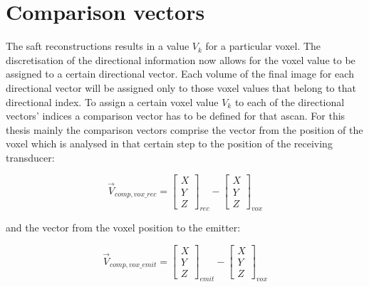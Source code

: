 \section{Comparison vectors}
\label{sec:comp_vect}

The \ac{saft} reconstructions results in a value $V_k$ for a particular voxel. The discretisation of the directional information now allows for the voxel value to be assigned to a certain directional vector. Each volume of the final image for each directional vector will be assigned only to those voxel values that belong to that directional index.
To assign a certain voxel value $V_k$ to each of the directional vectors' indices a comparison vector has to be defined for that \ac{ascan}. For this thesis mainly the comparison vectors comprise the vector from the position of the voxel which is analysed in that certain step to the position of the receiving transducer:

\begin{equation}
\vec{V}_{comp,vox\_rec} = \begin{bmatrix}
X
\\
Y 
\\
Z 
\end{bmatrix}_{rec}
-
\begin{bmatrix}
X
\\
Y 
\\
Z 
\end{bmatrix}_{vox}
\label{comp_vect}
\end{equation}

and the vector from the voxel position to the emitter:

\begin{equation}
\vec{V}_{comp,vox\_emit} = \begin{bmatrix}
X
\\
Y 
\\
Z 
\end{bmatrix}_{emit}
-
\begin{bmatrix}
X
\\
Y 
\\
Z 
\end{bmatrix}_{vox}
\label{comp_vec2t}
\end{equation}

